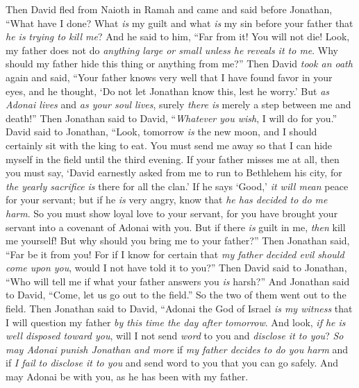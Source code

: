 \begin{biblechapter} %
 Then David fled from Naioth in Ramah and came and said before Jonathan, “What have I done? What \textit{is} my guilt and what \textit{is} my sin before your father that \textit{he is} \textit{trying to kill me}?
\verse And he said to him, “Far from it! You will not die! Look, my father does not do \textit{anything large or small unless he reveals it to me}. Why should my father hide this thing or anything from me?”
\verse Then David \textit{took an oath} again and said, “Your father knows very well that I have found favor in your eyes, and he thought, ‘Do not let Jonathan know this, lest he worry.’ But \textit{as Adonai lives} and \textit{as your soul lives}, surely \textit{there is} merely a step between me and death!”
\verse Then Jonathan said to David, “\textit{Whatever you wish}, I will do for you.”
\verse David said to Jonathan, “Look, tomorrow \textit{is} the new moon, and I should certainly sit with the king to eat. You must send me away so that I can hide myself in the field until the third evening.
\verse If your father misses me at all, then you must say, ‘David earnestly asked from me to run to Bethlehem his city, for \textit{the yearly sacrifice} \textit{is} there for all the clan.’
\verse If he says ‘Good,’ \textit{it will mean} peace for your servant; but if he \textit{is} very angry, know that \textit{he has decided to do me harm}.
\verse So you must show loyal love to your servant, for you have brought your servant into a covenant of Adonai with you. But if there \textit{is} guilt in me, \textit{then} kill me yourself! But why should you bring me to your father?”
\verse Then Jonathan said, “Far be it from you! For if I know for certain that \textit{my father decided evil should come upon you}, would I not have told it to you?”
\verse Then David said to Jonathan, “Who will tell me if what your father answers you \textit{is} harsh?”
\verse And Jonathan said to David, “Come, let us go out to the field.” So the two of them went out to the field.
\verse Then Jonathan said to David, “Adonai the God of Israel \textit{is my witness} that I will question my father \textit{by this time the day after tomorrow}. And look, \textit{if he is well disposed toward you}, will I not send \textit{word} to you and \textit{disclose it to you}?
\verse \textit{So may Adonai punish Jonathan and more} if \textit{my father decides to do you harm} and if \textit{I fail to disclose it to you} and send word to you that you can go safely. And may Adonai be with you, as he has been with my father.

\end{biblechapter}
